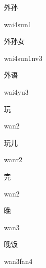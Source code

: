 \begin{multicols*}{2}
\begin{verbete}{外孙}
\begin{pronuncia}{wai4sun1}
\end{pronuncia}
\end{verbete}

\begin{verbete}{外孙女}
\begin{pronuncia}{wai4sun1nv3}
\end{pronuncia}
\end{verbete}

\begin{verbete}[wai4yu3]{外语}
\begin{pronuncia}{wai4yu3}
\end{pronuncia}
\end{verbete}

\begin{verbete}[wan2]{玩}
\begin{pronuncia}{wan2}
\end{pronuncia}
\end{verbete}

\begin{verbete}[wanr2]{玩儿}
\begin{pronuncia}{wanr2}
\end{pronuncia}
\end{verbete}

\begin{verbete}[wan2]{完}
\begin{pronuncia}{wan2}
\end{pronuncia}
\end{verbete}

\begin{verbete}[wan3]{晚}
\begin{pronuncia}{wan3}
\end{pronuncia}
\end{verbete}

\begin{verbete}{晚饭}
\begin{pronuncia}{wan3fan4}
\end{pronuncia}
\end{verbete}


\end{multicols*}
